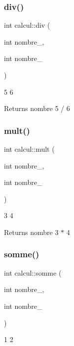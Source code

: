 \subsubsection{\texorpdfstring{div()}{div()}}
{\footnotesize\ttfamily int calcul\+::div (\begin{DoxyParamCaption}\item[{int}]{nombre\+\_,  }\item[{int}]{nombre\+\_ }\end{DoxyParamCaption})}



5  6 

\begin{DoxyReturn}{Returns}
nombre 5 / 6 
\end{DoxyReturn}
\mbox{\label{classcalcul_abcd7959addf8dbb37033863a08427c35}} 
\subsubsection{\texorpdfstring{mult()}{mult()}}
{\footnotesize\ttfamily int calcul\+::mult (\begin{DoxyParamCaption}\item[{int}]{nombre\+\_,  }\item[{int}]{nombre\+\_ }\end{DoxyParamCaption})}



3  4 

\begin{DoxyReturn}{Returns}
nombre 3 $\ast$ 4 
\end{DoxyReturn}
\mbox{\label{classcalcul_a40f51a847c5ac1001051a9631e5e1e08}} 
\subsubsection{\texorpdfstring{somme()}{somme()}}
{\footnotesize\ttfamily int calcul\+::somme (\begin{DoxyParamCaption}\item[{int}]{nombre\+\_,  }\item[{int}]{nombre\+\_ }\end{DoxyParamCaption})}



1  2 

